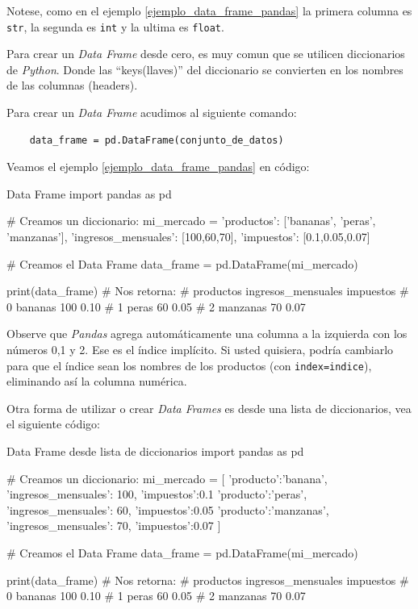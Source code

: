Notese, como en el ejemplo \ref{ejemplo_data_frame_pandas} la primera columna es \texttt{str}, la segunda es \texttt{int} y la ultima es \texttt{float}.

Para crear un \textit{Data Frame} desde cero, es muy comun que se utilicen diccionarios de \textit{Python}. Donde las ``keys(llaves)'' del diccionario se convierten en los nombres de las columnas (headers).

Para crear un \textit{Data Frame} acudimos al siguiente comando:
\begin{verbatim}
    data_frame = pd.DataFrame(conjunto_de_datos)
\end{verbatim}

Veamos el ejemplo \ref{ejemplo_data_frame_pandas} en código:
\begin{pycode}{Data Frame}
import pandas as pd

# Creamos un diccionario:
mi_mercado = {
    'productos': ['bananas', 'peras', 'manzanas'], 
    'ingresos_mensuales': [100,60,70],
    'impuestos': [0.1,0.05,0.07]
}

# Creamos el Data Frame
data_frame = pd.DataFrame(mi_mercado)

print(data_frame) # Nos retorna:
#   productos  ingresos_mensuales  impuestos
# 0   bananas                 100       0.10
# 1     peras                  60       0.05
# 2  manzanas                  70       0.07

\end{pycode}

\begin{nota}
    Observe que \textit{Pandas} agrega automáticamente una columna a la izquierda con los números 0,1 y 2. Ese es el índice implícito. Si usted quisiera, podría cambiarlo para que el índice sean los nombres de los productos (con \texttt{index=indice}), eliminando así la columna numérica. 
\end{nota}

Otra forma de utilizar o crear \textit{Data Frames} es desde una lista de diccionarios, vea el siguiente código:
\begin{pycode}{Data Frame desde lista de diccionarios}
import pandas as pd

# Creamos un diccionario:
mi_mercado = [
    {'producto':'banana', 'ingresos_mensuales': 100, 'impuestos':0.1}
    {'producto':'peras', 'ingresos_mensuales': 60, 'impuestos':0.05}
    {'producto':'manzanas', 'ingresos_mensuales': 70, 'impuestos':0.07}
]

# Creamos el Data Frame
data_frame = pd.DataFrame(mi_mercado)

print(data_frame) # Nos retorna:
#   productos  ingresos_mensuales  impuestos
# 0   bananas                 100       0.10
# 1     peras                  60       0.05
# 2  manzanas                  70       0.07    
\end{pycode}

